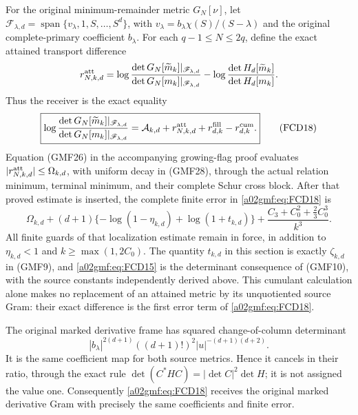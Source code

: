 \documentclass[11pt,a4paper]{article}
\begin{document}
For the original minimum-remainder metric \(G_N[\nu]\), let
\(\mathscr F_{\lambda,d}
 =\operatorname{span}\{v_\lambda,1,S,\ldots,S^d\}\), with
\(v_\lambda=b_\lambda\chi(S)/(S-\lambda)\) and the original
complete-primary coefficient \(b_\lambda\).
For each \(q-1\le N\le2q\), define the exact attained transport difference
\[
 r_{N,k,d}^{\rm att}
  =\log\frac{\det G_N[\widetilde m_k]|_{\mathscr F_{\lambda,d}}}
                  {\det G_N[m_k]|_{\mathscr F_{\lambda,d}}}
    -\log\frac{\det H_d[\widetilde m_k]}{\det H_d[m_k]} .
\]
Thus the receiver is the exact equality
\begin{equation}
 \boxed{\displaystyle
 \log\frac{\det G_N[\widetilde m_k]|_{\mathscr F_{\lambda,d}}}
                  {\det G_N[m_k]|_{\mathscr F_{\lambda,d}}}
  =\mathcal A_{k,d}+r_{N,k,d}^{\rm att}
                          +r_{d,k}^{\rm fill}-r_{d,k}^{\rm cum}.}
 \tag{FCD18}\label{a02gmf:eq:FCD18}
\end{equation}
Equation (GMF26) in the accompanying growing-flag proof evaluates
\(|r_{N,k,d}^{\rm att}|\le\Omega_{k,d}\), with uniform decay in (GMF28),
through the actual relation
minimum, terminal minimum, and their complete Schur cross block.
After that proved estimate is inserted, the complete finite error in
\eqref{a02gmf:eq:FCD18} is
\begin{equation}
 \Omega_{k,d}
 +(d+1)\{-\log(1-\eta_{k,d})+\log(1+t_{k,d})\}
 +\frac{C_3+C_0^2+\tfrac23C_0^3}{k^3}.
 \tag{FCD19}\label{a02gmf:eq:FCD19}
\end{equation}
All finite guards of that localization estimate remain in force, in
addition to \(\eta_{k,d}<1\) and \(k\ge\max(1,2C_0)\).
The quantity \(t_{k,d}\) in this section is exactly \(\zeta_{k,d}\)
in (GMF9), and \eqref{a02gmf:eq:FCD15} is the determinant consequence
of (GMF10), with the source constants independently derived above.
This cumulant calculation alone makes no replacement of an attained
metric by its unquotiented source Gram: their exact difference is
the first error term of \eqref{a02gmf:eq:FCD18}.

The original marked derivative frame has squared change-of-column
determinant
\[
 |b_\lambda|^{2(d+1)}((d+1)!)^2
                  |u|^{-(d+1)(d+2)} .
\]
It is the same coefficient map for both source metrics. Hence it cancels
in their ratio, through the exact rule
\(\det(C^*HC)=|\det C|^2\det H\); it is not assigned the value one.
Consequently \eqref{a02gmf:eq:FCD18} receives the original marked derivative
Gram with precisely the same coefficients and finite error.
\end{document}
